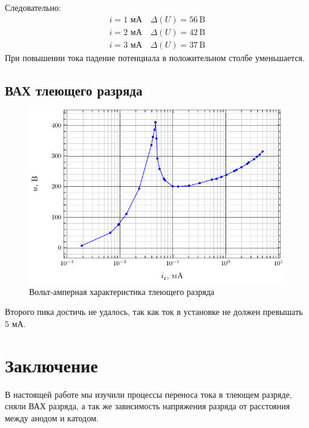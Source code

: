 \documentclass[a5paper,11pt]{extarticle}
\begin{document}
Следовательно:
\begin{gather}
	i=1\text{ мА} \quad \Delta(U) = 56  \,\text{B}\\
	i=2\text{ мА} \quad \Delta(U) = 42  \,\text{B}\\
	i=3\text{ мА} \quad \Delta(U) = 37  \,\text{B}
\end{gather}
При повышении тока падение потенциала в положительном столбе уменьшается.
\subsection{ВАХ тлеющего разряда}
\begin{figure}[H]
	\centering
	\includegraphics[]{fig/vax.pdf}
	\caption{Вольт-амперная характеристика тлеющего разряда}
	\label{fig:2}
\end{figure}
Второго пика достичь не удалось, так как ток в установке не должен превышать $5\text{ мА}$.


\section*{Заключение}
В настоящей работе мы изучили процессы переноса тока в тлеющем разряде, сняли ВАХ разряда, а так же зависимость напряжения разряда от расстояния между анодом и катодом.

  
  
\end{document}
